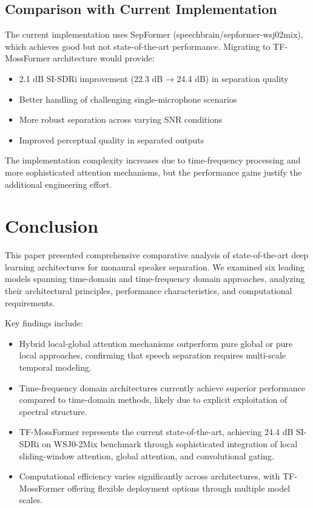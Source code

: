 \documentclass[conference]{IEEEtran}
\begin{document}
\subsection{Comparison with Current Implementation}

The current implementation uses SepFormer (speechbrain/sepformer-wsj02mix), which achieves good but not state-of-the-art performance. Migrating to TF-MossFormer architecture would provide:

\begin{itemize}
    \item 2.1 dB SI-SDRi improvement (22.3 dB → 24.4 dB) in separation quality
    \item Better handling of challenging single-microphone scenarios
    \item More robust separation across varying SNR conditions
    \item Improved perceptual quality in separated outputs
\end{itemize}

The implementation complexity increases due to time-frequency processing and more sophisticated attention mechanisms, but the performance gains justify the additional engineering effort.

\section{Conclusion}

This paper presented comprehensive comparative analysis of state-of-the-art deep learning architectures for monaural speaker separation. We examined six leading models spanning time-domain and time-frequency domain approaches, analyzing their architectural principles, performance characteristics, and computational requirements.

Key findings include:

\begin{itemize}
    \item Hybrid local-global attention mechanisms outperform pure global or pure local approaches, confirming that speech separation requires multi-scale temporal modeling.
    
    \item Time-frequency domain architectures currently achieve superior performance compared to time-domain methods, likely due to explicit exploitation of spectral structure.
    
    \item TF-MossFormer represents the current state-of-the-art, achieving 24.4 dB SI-SDRi on WSJ0-2Mix benchmark through sophisticated integration of local sliding-window attention, global attention, and convolutional gating.
    
    \item Computational efficiency varies significantly across architectures, with TF-MossFormer offering flexible deployment options through multiple model scales.
\end{itemize}
\end{document}
